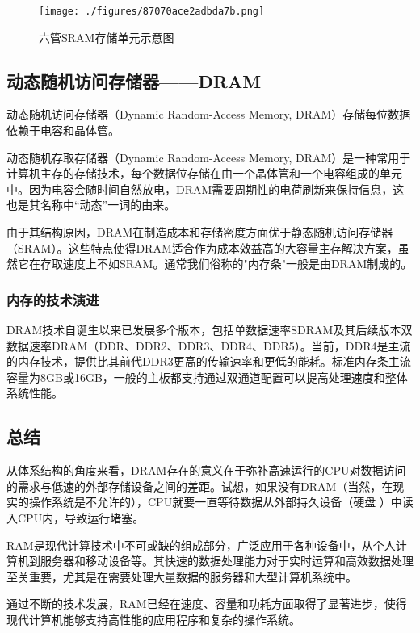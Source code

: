 \begin{figure}[ht]
\centering
\texttt{[image: ./figures/87070ace2adbda7b.png]}
\caption{六管SRAM存储单元示意图} \label{fig_RAM_3}
\end{figure}


\subsection{动态随机访问存储器——DRAM}

动态随机访问存储器（Dynamic Random-Access Memory, DRAM）存储每位数据依赖于电容和晶体管。

动态随机存取存储器（Dynamic Random-Access Memory, DRAM）是一种常用于计算机主存的存储技术，每个数据位存储在由一个晶体管和一个电容组成的单元中。因为电容会随时间自然放电，DRAM需要周期性的电荷刷新来保持信息，这也是其名称中“动态”一词的由来。


由于其结构原因，DRAM在制造成本和存储密度方面优于静态随机访问存储器（SRAM）。这些特点使得DRAM适合作为成本效益高的大容量主存解决方案，虽然它在存取速度上不如SRAM。通常我们俗称的"内存条"一般是由DRAM制成的。

\subsubsection{内存的技术演进}
DRAM技术自诞生以来已发展多个版本，包括单数据速率SDRAM及其后续版本双数据速率DRAM（DDR、DDR2、DDR3、DDR4、DDR5）。当前，DDR4是主流的内存技术，提供比其前代DDR3更高的传输速率和更低的能耗。标准内存条主流容量为8GB或16GB，一般的主板都支持通过双通道配置可以提高处理速度和整体系统性能。


\subsection{总结}
从体系结构的角度来看，DRAM存在的意义在于弥补高速运行的CPU对数据访问的需求与低速的外部存储设备之间的差距。试想，如果没有DRAM（当然，在现实的操作系统是不允许的），CPU就要一直等待数据从外部持久设备（硬盘 ）中读入CPU内，导致运行堵塞。

RAM是现代计算技术中不可或缺的组成部分，广泛应用于各种设备中，从个人计算机到服务器和移动设备等。其快速的数据处理能力对于实时运算和高效数据处理至关重要，尤其是在需要处理大量数据的服务器和大型计算机系统中。

通过不断的技术发展，RAM已经在速度、容量和功耗方面取得了显著进步，使得现代计算机能够支持高性能的应用程序和复杂的操作系统。

